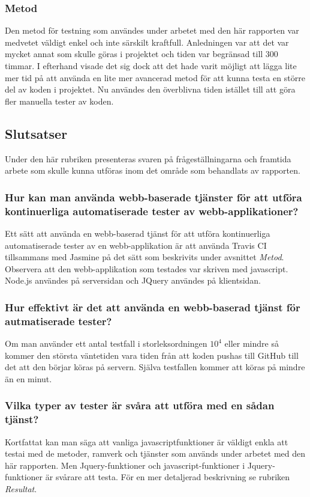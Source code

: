 \subsubsection{Metod}
Den metod för testning som användes under arbetet med den här rapporten var
medvetet väldigt enkel och inte särskilt kraftfull. Anledningen var
att det var mycket annat som skulle göras i projektet och tiden var
begränsad till 300 timmar. I efterhand visade det sig dock att det hade varit 
möjligt att lägga lite mer tid på att använda en lite
mer avancerad metod för att kunna testa en större
del av koden i projektet. Nu användes den överblivna tiden istället till
att göra fler manuella tester av koden.

\subsection{Slutsatser}
Under den här rubriken presenteras svaren på
frågeställningarna och framtida arbete som skulle
kunna utföras inom det område som behandlats av rapporten.

\subsubsection{Hur kan man använda webb-baserade tjänster för
att utföra kontinuerliga automatiserade tester av webb-applikationer?}
Ett sätt att använda en webb-baserad tjänst för att utföra kontinuerliga 
automatiserade tester av en webb-applikation är att använda  
Travis CI tillsammans med Jasmine på det sätt som beskrivits
under avsnittet \emph{Metod}. Observera att den webb-applikation som testades
var skriven med javascript. Node.js användes på serversidan och 
JQuery användes på klientsidan.

\subsubsection{Hur effektivt är det att använda en webb-baserad tjänst
för autmatiserade tester?}
Om man använder ett antal testfall i storleksordningen $10^4$ eller
mindre så kommer den största väntetiden vara tiden från att koden
pushas till GitHub till det att den börjar köras på servern. Själva
testfallen kommer att köras på mindre än en minut.

\subsubsection{Vilka typer av tester är svåra att utföra 
med en sådan tjänst?}
Kortfattat kan man säga att vanliga javascriptfunktioner är
väldigt enkla att testai med de metoder, ramverk och tjänster som
används under arbetet med den här rapporten. Men Jquery-funktioner och
javascript-funktioner i Jquery-funktioner är svårare att
testa. För en mer detaljerad beskrivning se rubriken \emph{Resultat}.

